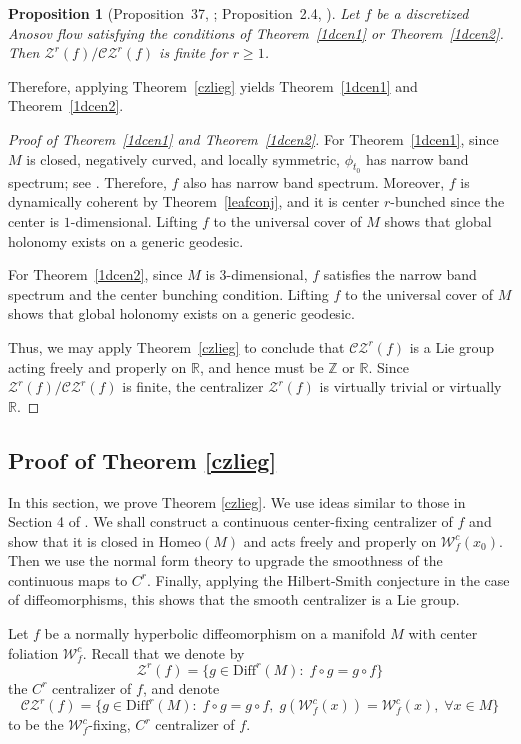 \documentclass[11pt]{amsart}
\numberwithin{equation}{section}
\newcommand{\R}{\mathbb{R}}
\newcommand{\Z}{\mathbb{Z}}
\newcommand{\W}{\mathcal{W}}
\newcommand{\CZ}{\mathcal{CZ}}
\theoremstyle{plain}
\newtheorem{prop}[thm]{Proposition}
\begin{document}
\begin{prop}[Proposition~37, \cite{DWX}; Proposition~2.4, \cite{BG}]
Let $f$ be a discretized Anosov flow satisfying the conditions of Theorem~\ref{1dcen1} or Theorem~\ref{1dcen2}. Then $\mathcal{Z}^r(f)/\CZ^r(f)$ is finite for $r\ge 1$.
\end{prop}

Therefore, applying Theorem~\ref{czlieg} yields Theorem~\ref{1dcen1} and Theorem~\ref{1dcen2}.

\begin{proof}[Proof of Theorem~\ref{1dcen1} and Theorem~\ref{1dcen2}]
For Theorem~\ref{1dcen1}, since $M$ is closed, negatively curved, and locally symmetric, $\phi_{t_0}$ has narrow band spectrum; see \cite[Lemma~26]{DWX}. Therefore, $f$ also has narrow band spectrum. Moreover, $f$ is dynamically coherent by Theorem~\ref{leafconj}, and it is center $r$-bunched since the center is $1$-dimensional. Lifting $f$ to the universal cover of $M$ shows that global holonomy exists on a generic geodesic.

For Theorem~\ref{1dcen2}, since $M$ is $3$-dimensional, $f$ satisfies the narrow band spectrum and the center bunching condition. Lifting $f$ to the universal cover of $M$ shows that global holonomy exists on a generic geodesic.

Thus, we may apply Theorem~\ref{czlieg} to conclude that $\CZ^r(f)$ is a Lie group acting freely and properly on $\R$, and hence must be $\Z$ or $\R$. Since $\mathcal{Z}^r(f)/\CZ^r(f)$ is finite, the centralizer $\mathcal{Z}^r(f)$ is virtually trivial or virtually $\R$.
\end{proof}
\subsection{Proof of Theorem \ref{czlieg}}\label{pfczlieg}
In this section, we prove Theorem \ref{czlieg}. We use ideas similar to those in Section 4 of \cite{DWX23}. {We shall construct a continuous center-fixing centralizer of $f$ and show that it is closed in $\mathrm{Homeo}(M)$ and acts freely and properly on $\W^c_f(x_0)$. Then we use the normal form theory to upgrade the smoothness of the continuous maps to $C^r$. Finally, applying the Hilbert-Smith conjecture in the case of diffeomorphisms, this shows that the smooth centralizer is a Lie group.}

Let $f$ be a normally hyperbolic diffeomorphism on a manifold $M$ with center foliation $\W^c_f$. Recall that we denote by
$$\mathcal{Z}^r(f)=\{g\in \mathrm{Diff}^r(M):\; f\circ g=g\circ f\}$$
the $C^r$ centralizer of $f$, and denote
$$\CZ^r(f)=\{g\in \mathrm{Diff}^r(M):\; f\circ g=g\circ f,\; g(\W^c_f(x))=\W^c_f(x),\; \forall x\in M\}$$
to be the $\W^c_f$-fixing, $C^r$ centralizer of $f$.
\end{document}
